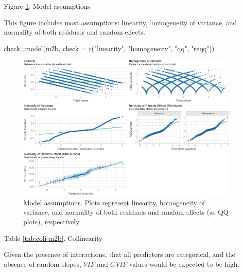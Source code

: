 \documentclass[
  bookmarksnumbered]{article}
\newenvironment{Shaded}{\begin{snugshade}}{\end{snugshade}}
\newcommand{\AttributeTok}[1]{\textcolor[rgb]{0.80,0.80,0.80}{#1}}
\newcommand{\FunctionTok}[1]{\textcolor[rgb]{0.94,0.94,0.56}{#1}}
\newcommand{\NormalTok}[1]{\textcolor[rgb]{0.80,0.80,0.80}{#1}}
\newcommand{\StringTok}[1]{\textcolor[rgb]{0.80,0.58,0.58}{#1}}
\begin{document}
Figure \ref{fig:assu-m2b}. Model assumptions

This figure includes most assumptions: linearity, homogeneity of variance, and normality of both residuals and random effects.

\begin{Shaded}
\begin{Highlighting}[]
\FunctionTok{check\_model}\NormalTok{(m2b,}
            \AttributeTok{check =} \FunctionTok{c}\NormalTok{(}\StringTok{"linearity"}\NormalTok{, }\StringTok{"homogeneity"}\NormalTok{, }\StringTok{"qq"}\NormalTok{, }\StringTok{"reqq"}\NormalTok{))}
\end{Highlighting}
\end{Shaded}

\begin{figure}
\centering
\includegraphics{Sexual_Desire_Arousal_files/figure-latex/assu-m2b-1.pdf}
\caption{\label{fig:assu-m2b}Model assumptions. Plots represent linearity, homogeneity of variance, and normality of both residuals and random effects (as QQ plots), respectively.}
\end{figure}

Table \ref{tab:coli-m2b}. Collinearity

Given the presence of interactions, that all predictors are categorical, and the absence of random slopes, \(VIF\) and \(GVIF\) values would be expected to be high.
\end{document}

